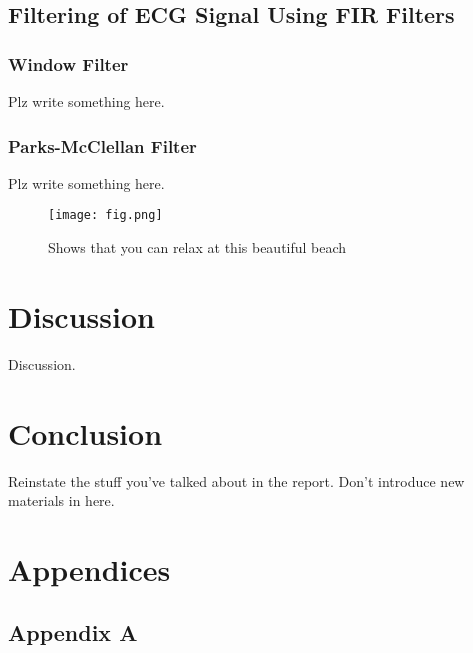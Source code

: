 \documentclass[a4paper, 11pt]{article}
\begin{document}
\subsection{Filtering of ECG Signal Using FIR Filters}\label{sec:meth_sub5}
    \subsubsection{Window Filter}
        Plz write something here.
    \subsubsection{Parks-McClellan Filter}
        Plz write something here.
        
    \begin{figure}[h]
        \centering
        \graphicspath{{./wiki/}}
        \texttt{[image: fig.png]}
        \caption{Shows that you can relax at this beautiful beach}
        \label{Fig:my_label}
    \end{figure}

\section{Discussion}\label{sec:dis}
    Discussion.

\section{Conclusion}\label{sec:conc}
    Reinstate the stuff you've talked about in the report. Don't introduce new materials in here.

\pagebreak

\renewcommand{\bibname}{References}
\renewcommand{\bibsection}{\section{\bibname}}
\renewcommand{\cite}{\citep}

\pagebreak

\section{Appendices}
    \subsection{Appendix A}
\end{document}
